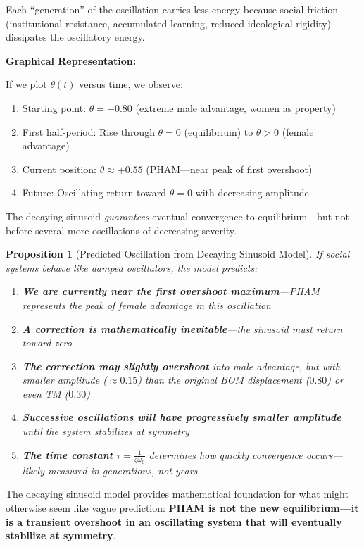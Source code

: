 \documentclass[12pt, letterpaper]{article}
\newtheorem{proposition}{Proposition}[section]
\begin{document}
Each ``generation'' of the oscillation carries less energy because social friction (institutional resistance, accumulated learning, reduced ideological rigidity) dissipates the oscillatory energy.

\textbf{Graphical Representation:}

If we plot $\theta(t)$ versus time, we observe:
\begin{enumerate}
    \item Starting point: $\theta = -0.80$ (extreme male advantage, women as property)
    \item First half-period: Rise through $\theta = 0$ (equilibrium) to $\theta > 0$ (female advantage)
    \item Current position: $\theta \approx +0.55$ (PHAM---near peak of first overshoot)
    \item Future: Oscillating return toward $\theta = 0$ with decreasing amplitude
\end{enumerate}

The decaying sinusoid \textit{guarantees} eventual convergence to equilibrium---but not before several more oscillations of decreasing severity.

\begin{proposition}[Predicted Oscillation from Decaying Sinusoid Model]
If social systems behave like damped oscillators, the model predicts:
\begin{enumerate}
    \item \textbf{We are currently near the first overshoot maximum}---PHAM represents the peak of female advantage in this oscillation
    \item \textbf{A correction is mathematically inevitable}---the sinusoid must return toward zero
    \item \textbf{The correction may slightly overshoot} into male advantage, but with smaller amplitude ($\approx 0.15$) than the original BOM displacement ($0.80$) or even TM ($0.30$)
    \item \textbf{Successive oscillations will have progressively smaller amplitude} until the system stabilizes at symmetry
    \item \textbf{The time constant} $\tau = \frac{1}{\zeta\omega_0}$ determines how quickly convergence occurs---likely measured in generations, not years
\end{enumerate}
\end{proposition}

The decaying sinusoid model provides mathematical foundation for what might otherwise seem like vague prediction: \textbf{PHAM is not the new equilibrium---it is a transient overshoot in an oscillating system that will eventually stabilize at symmetry}.
\end{document}
